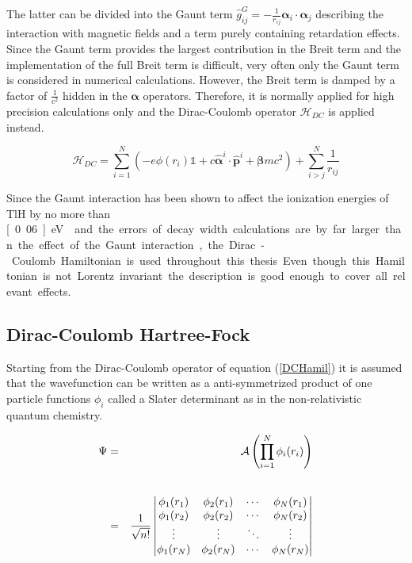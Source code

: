 The latter can be divided into the Gaunt term
$\hat{g}_{ij}^G = - \frac1{r_{ij}}\boldsymbol{\alpha}_i\cdot\boldsymbol{\alpha}_j$
describing the interaction
with magnetic fields and a term purely containing retardation effects.
Since the Gaunt term provides the largest contribution in the Breit term and the
implementation of the full Breit term is difficult, very often only the Gaunt term
is considered in numerical calculations.
However, the Breit term is damped by a factor of $\frac 1{c^2}$ hidden in the
$\boldsymbol{\alpha}$ operators. Therefore, it is normally applied
for high precision calculations
only and the Dirac-Coulomb operator $\mathcal{H}_{DC}$ is applied instead.

\begin{equation}\label{DCHamil}
\mathcal{H}_{DC} = \sum\limits_{i=1}^N (-e \phi(r_i)\mathds{1}+c\hat{\boldsymbol{\alpha}}^{i}\cdot\hat{\mathbf{p}}^{i}+\boldsymbol{\beta}mc^2) + \sum\limits_{i>j}^N \frac1{r_{ij}}
\end{equation}


Since the Gaunt interaction has been shown to affect the ionization energies of
TlH by no more than \unit[0.06]{eV} \cite{Pernpointner05} and the errors of
decay width calculations
are by far larger than the effect of the
Gaunt interaction, the Dirac-Coulomb Hamiltonian is used throughout this thesis.
Even though this Hamiltonian is not Lorentz invariant the description is good
enough to cover all relevant effects.

\subsection{Dirac-Coulomb Hartree-Fock}
Starting from the Dirac-Coulomb operator of equation (\ref{DCHamil}) it is assumed
that the wavefunction can be written as a anti-symmetrized product of one particle
functions $\phi_i$ called a Slater determinant as in the
non-relativistic quantum chemistry.

\begin{eqnarray}
\Psi &=& \mathcal{A} \left(\prod\limits_{i=1}^N\phi_i(r_i)\right)\\\vphantom{\rule{0pt}{50pt}}
     &=& \frac1{\sqrt{n!}}\begin{vmatrix}
\phi_1(r_1) & \phi_2(r_1) & \cdots & \phi_N(r_1)\\
\phi_1(r_2) & \phi_2(r_2) & \cdots & \phi_N(r_2)\\
\vdots      & \vdots     & \ddots  & \vdots\\
\phi_1(r_N) & \phi_2(r_N) & \cdots & \phi_N(r_N)\\
\end{vmatrix}
\end{eqnarray}

